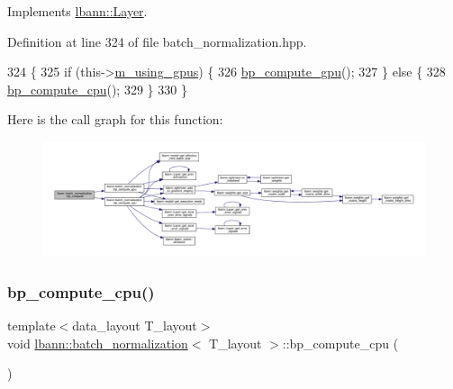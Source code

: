 Implements \hyperlink{classlbann_1_1Layer_a7442e01f9ee1294df2de811efcf5171e}{lbann\+::\+Layer}.



Definition at line 324 of file batch\+\_\+normalization.\+hpp.


\begin{DoxyCode}
324                              \{
325     \textcolor{keywordflow}{if} (this->\hyperlink{classlbann_1_1Layer_af7881cb5eff5207c15fa835d65462e8f}{m\_using\_gpus}) \{
326       \hyperlink{classlbann_1_1batch__normalization_a7d48ad1531825fc9745c77f9ae5f68d6}{bp\_compute\_gpu}();
327     \} \textcolor{keywordflow}{else} \{
328       \hyperlink{classlbann_1_1batch__normalization_a83e40edd001a0b71c31fbc9a3acb2231}{bp\_compute\_cpu}();
329     \}
330   \}
\end{DoxyCode}
Here is the call graph for this function\+:\nopagebreak
\begin{figure}[H]
\begin{center}
\leavevmode
\includegraphics[width=350pt]{classlbann_1_1batch__normalization_ad9aedd689cd8923d8c8e9c4e57a4e8b7_cgraph}
\end{center}
\end{figure}
\mbox{\label{classlbann_1_1batch__normalization_a83e40edd001a0b71c31fbc9a3acb2231}} 
\subsubsection{\texorpdfstring{bp\+\_\+compute\+\_\+cpu()}{bp\_compute\_cpu()}}
{\footnotesize\ttfamily template$<$data\+\_\+layout T\+\_\+layout$>$ \\
void \hyperlink{classlbann_1_1batch__normalization}{lbann\+::batch\+\_\+normalization}$<$ T\+\_\+layout $>$\+::bp\+\_\+compute\+\_\+cpu (\begin{DoxyParamCaption}{ }\end{DoxyParamCaption})\hspace{0.3cm}{\ttfamily [inline]}}



